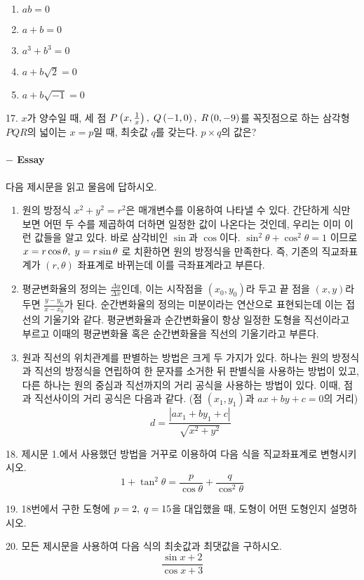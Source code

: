 \documentclass[paper=a4, fontsize=11pt]{scrartcl} %
\numberwithin{equation}{section} %
\numberwithin{figure}{section} %
\numberwithin{table}{section} %
\theoremstyle{plain}
\newcommand{\Com}{,\Hs}
\newcommand{\Hs}{\hspace{0.1cm}}
\newcommand{\VS}{\vspace{0.3cm}}
\newcommand{\BKS}[1]{\left( #1 \right)}
\begin{document}
\begin{enumerate}
 \item $ab=0$
 \item $a+b=0$
 \item $a^3 +b^3 =0 $
 \item $a + b \sqrt{2} = 0$
 \item $a+b\sqrt{-1} = 0 $
\end{enumerate}

\VS

17. $x$가 양수일 때, 세 점 $P\BKS{x, \frac{1}{x}}\Com Q\BKS{-1,0}\Com R\BKS{0,-9}$를 꼭짓점으로 하는 삼각형 $PQR$의 넓이는 $x=p$일 때, 최솟값
$q$를 갖는다. $p\times q$의 값은?

\pagebreak
\paragraph{$-$ Essay}

다음 제시문을 읽고 물음에 답하시오.

\begin{enumerate}
 \item 원의 방정식 $x^2 +y^2 =r^2$은 매개변수를 이용하여 나타낼 수 있다. 간단하게 식만 보면 어떤 두 수를 제곱하여 더하면 일정한 값이 나온다는 것인데,
 우리는 이미 이런 값들을 알고 있다. 바로 삼각비인 $\sin$과 $\cos$이다. $\sin^2{\theta} + \cos^2{\theta} = 1$ 이므로 $x = r\cos{\theta}\Com y=r\sin{\theta}$
 로 치환하면 원의 방정식을 만족한다. 즉, 기존의 직교좌표계가 $(r,\theta)$ 좌표계로 바뀌는데 이를 극좌표계라고 부른다.
 \item 평균변화율의 정의는 $\frac{\Delta y}{\Delta x}$인데, 이는 시작점을 $(x_0 , y_0)$라 두고 끝 점을 $(x,y)$라 두면 $\frac{y-y_0}{x-x_0}$가 된다.
 순간변화율의 정의는 미분이라는 연산으로 표현되는데 이는 접선의 기울기와 같다. 평균변화율과 순간변화율이 항상 일정한 도형을 직선이라고 부르고 이때의 
 평균변화율 혹은 순간변화율을 직선의 기울기라고 부른다.
 \item 원과 직선의 위치관계를 판별하는 방법은 크게 두 가지가 있다. 하나는 원의 방정식과 직선의 방정식을 연립하여 한 문자를 소거한 뒤 판별식을 사용하는 방법이 있고,
 다른 하나는 원의 중심과 직선까지의 거리 공식을 사용하는 방법이 있다. 이때, 점과 직선사이의 거리 공식은 다음과 같다. (점 $(x_1,y_1)$과 $ax+by+c=0$의 거리)
 \begin{equation*}
  d = \frac{|ax_1+by_1+c|}{\sqrt{x^2 + y^2}}
 \end{equation*}
\end{enumerate}
\VS
18. \Hs 제시문 1.에서 사용했던 방법을 거꾸로 이용하여 다음 식을 직교좌표계로 변형시키시오.
\begin{equation*}
 1+\tan^2{\theta} = \frac{p}{\cos{\theta}} + \frac{q}{\cos^2{\theta}}
\end{equation*}

\vspace{2cm}

19. 18번에서 구한 도형에 $p=2\Com q=15$을 대입했을 때, 도형이 어떤 도형인지 설명하시오.

\vspace{3cm}

20. 모든 제시문을 사용하여 다음 식의 최솟값과 최댓값을 구하시오.
\begin{equation*}
 \frac{\sin x + 2}{\cos x + 3}
\end{equation*}

\end{document}
